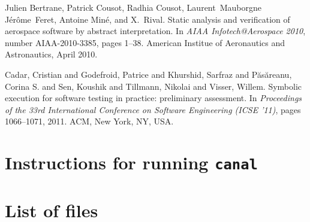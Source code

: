 \documentclass[12pt,final,oneside]{fithesis2}
\theoremstyle{definition}
\begin{document}
\begin{thebibliography}{99}
Julien Bertrane, Patrick Cousot, Radhia Cousot, Laurent~Mauborgne
  J{\'e}r{\^o}me~Feret, Antoine Min{\'e}, and X.~Rival.
\newblock Static analysis and verification of aerospace software by abstract
  interpretation.
\newblock In {\em AIAA Infotech@Aerospace 2010}, number AIAA-2010-3385, pages
  1--38. American Institue of Aeronautics and Astronautics, April 2010.

Cadar, Cristian and Godefroid, Patrice and Khurshid, Sarfraz and
  P\u{a}s\u{a}reanu, Corina S. and Sen, Koushik and Tillmann, Nikolai and
  Visser, Willem.
\newblock Symbolic execution for software testing in practice: preliminary
  assessment.
\newblock In \emph{Proceedings of the 33rd International Conference on
  Software Engineering (ICSE '11)}, pages 1066--1071, 2011. ACM, New York,
  NY, USA.

\end{thebibliography}


\appendix

\chapter{Instructions for running \texttt{canal}}
\label{chap:instructions}




\chapter{List of files}




\end{document}
